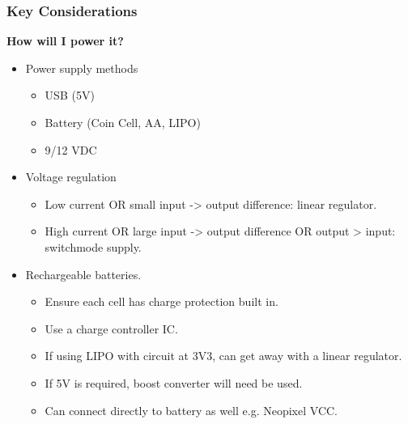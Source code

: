 \documentclass[t]{beamer}
\begin{document}
\begin{frame}
\frametitle{Key Considerations}
\large{\textbf{ How will I power it?}}
\vspace{1mm}
\begin{itemize}
	\item Power supply methods
	\begin{itemize}
		\item USB (5V)
		\item Battery (Coin Cell, AA, LIPO)
		\item 9/12 VDC
	\end{itemize}
	\item Voltage regulation
	\begin{itemize}
		\item Low current OR small input -> output difference: linear regulator.
		\item High current OR large input -> output difference OR output > input: switchmode supply.
	\end{itemize}
	\item Rechargeable batteries.
	\begin{itemize}
		\item Ensure each cell has charge protection built in.
		\item Use a charge controller IC.
		\item If using LIPO with circuit at 3V3, can get away with a linear regulator.
		\item If 5V is required, boost converter will need be used.
		\item Can connect directly to battery as well e.g. Neopixel VCC. 
	\end{itemize}
\end{itemize}
\end{frame}

\end{document}
